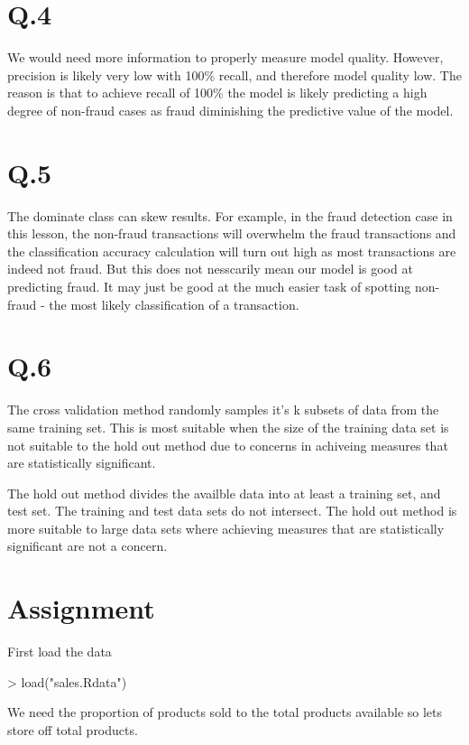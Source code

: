 \documentclass{article}
\begin{document}
\section*{Q.4}
We would need more information to properly measure model quality. However, precision is likely very low with 100\% recall, and therefore model quality low. The reason is that to achieve recall of 100\% the model is likely predicting a high degree of non-fraud cases as fraud diminishing the predictive value of the model. 

\section*{Q.5}
The dominate class can skew results. For example, in the fraud detection case in this lesson, the non-fraud transactions will overwhelm the fraud transactions and the classification accuracy calculation will turn out high as most transactions are indeed not fraud. But this does not nesscarily mean our model is good at predicting fraud. It may just be good at the much easier task of spotting non-fraud - the most likely classification of a transaction. 

\section*{Q.6}
The cross validation method randomly samples it's k subsets of data from the same training set. This is most suitable when the size of the training data set is not suitable to the hold out method due to concerns in achiveing measures that are statistically significant.  

The hold out method divides the availble data into at least a training set, and test set. The training and test data sets do not intersect. The hold out method is more suitable to large data sets where achieving measures that are statistically significant are not a concern. 

\section*{Assignment}
First load the data

\begin{Schunk}
\begin{Sinput}
> load("sales.Rdata")
\end{Sinput}
\end{Schunk}

We need the proportion of products sold to the total products available so lets store off total products. 
\end{document}
